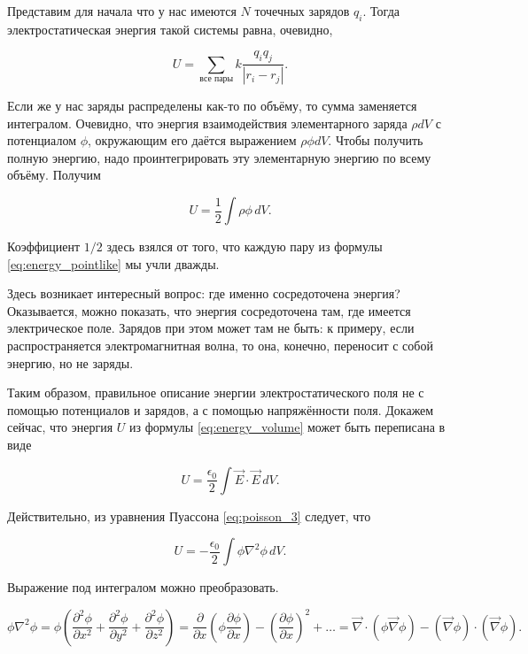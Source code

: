 \documentclass[12pt,a4paper]{article}
\numberwithin{equation}{section}
\numberwithin{equation}{section}
\newcommand{\pt}{\partial}
\newcommand{\vn}{\vec{\nabla}}
\newcommand{\eps}{\epsilon}
\begin{document}
Представим для начала что у нас имеются $N$ точечных зарядов
$q_i$. Тогда электростатическая энергия такой системы равна, очевидно, 

\begin{equation}
  \label{eq:energy_pointlike}
  U = \sum_{\text{все пары}} k \frac{q_i q_j}{|r_i - r_j|}.
\end{equation}

Если же у нас заряды распределены как-то по объёму, то сумма
заменяется интегралом. Очевидно, что энергия взаимодействия
элементарного заряда $\rho dV$ с потенциалом $\phi$, окружающим его
даётся выражением $\rho \phi dV$. Чтобы получить полную энергию,
надо проинтегрировать эту элементарную энергию по всему
объёму. Получим

\begin{equation}
  \label{eq:energy_volume}
  U = \frac12 \int \rho \phi\, dV.
\end{equation}

Коэффициент $1/2$ здесь взялся от того, что каждую пару из формулы
\eqref{eq:energy_pointlike} мы учли дважды. 

Здесь возникает интересный вопрос: где именно сосредоточена энергия?
Оказывается, можно показать, что энергия сосредоточена там, где
имеется электрическое поле. Зарядов при этом может там не быть: к
примеру, если распространяется электромагнитная волна, то она,
конечно, переносит с собой энергию, но не заряды. 

Таким образом, правильное описание энергии электростатического поля не
с помощью потенциалов и зарядов, а с помощью напряжённости
поля. Докажем сейчас, что энергия $U$ из формулы
\eqref{eq:energy_volume} может быть переписана в виде

\begin{equation}
  \label{eq:energy_field}
  U = \frac{\eps_0}{2} \int \vec{E} \cdot \vec{E} \, dV.
\end{equation}

Действительно, из уравнения Пуассона \eqref{eq:poisson_3} следует, что 

\begin{equation}
  \label{eq:energy_field_der_1}
  U = - \frac{\eps_0}{2} \int \phi \nabla^2 \phi \, dV.
\end{equation}

Выражение под интегралом можно преобразовать. 

\begin{equation}
  \label{eq:energy_field_der_2}
\phi \nabla^2 \phi = \phi \left( \frac{\pt^2 \phi}{\pt x^2} +
  \frac{\pt^2 \phi}{\pt y^2} +\frac{\pt^2 \phi}{\pt z^2} \right) =
\frac{\pt}{\pt x} \left( \phi \frac{\pt \phi}{\pt x} \right) - \left(
  \frac{\pt\phi}{\pt x} \right)^2 + \ldots = \vn \cdot (\phi \vn \phi)
- (\vn \phi) \cdot (\vn \phi).
\end{equation}
\end{document}
